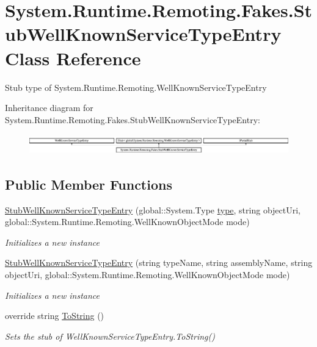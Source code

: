 \hypertarget{class_system_1_1_runtime_1_1_remoting_1_1_fakes_1_1_stub_well_known_service_type_entry}{\section{System.\-Runtime.\-Remoting.\-Fakes.\-Stub\-Well\-Known\-Service\-Type\-Entry Class Reference}
\label{class_system_1_1_runtime_1_1_remoting_1_1_fakes_1_1_stub_well_known_service_type_entry}
}


Stub type of System.\-Runtime.\-Remoting.\-Well\-Known\-Service\-Type\-Entry 


Inheritance diagram for System.\-Runtime.\-Remoting.\-Fakes.\-Stub\-Well\-Known\-Service\-Type\-Entry\-:\begin{figure}[H]
\begin{center}
\leavevmode
\includegraphics[height=0.886778cm]{class_system_1_1_runtime_1_1_remoting_1_1_fakes_1_1_stub_well_known_service_type_entry}
\end{center}
\end{figure}
\subsection*{Public Member Functions}
\begin{DoxyCompactItemize}
\item 
\hyperlink{class_system_1_1_runtime_1_1_remoting_1_1_fakes_1_1_stub_well_known_service_type_entry_a8bfaee9557196834b2a527d1a4659ef7}{Stub\-Well\-Known\-Service\-Type\-Entry} (global\-::\-System.\-Type \hyperlink{jquery-1_810_82-vsdoc_8js_a3940565e83a9bfd10d95ffd27536da91}{type}, string object\-Uri, global\-::\-System.\-Runtime.\-Remoting.\-Well\-Known\-Object\-Mode mode)
\begin{DoxyCompactList}\small\item\em Initializes a new instance\end{DoxyCompactList}\item 
\hyperlink{class_system_1_1_runtime_1_1_remoting_1_1_fakes_1_1_stub_well_known_service_type_entry_a31de50cb1a5d8957f6cc4330812f457a}{Stub\-Well\-Known\-Service\-Type\-Entry} (string type\-Name, string assembly\-Name, string object\-Uri, global\-::\-System.\-Runtime.\-Remoting.\-Well\-Known\-Object\-Mode mode)
\begin{DoxyCompactList}\small\item\em Initializes a new instance\end{DoxyCompactList}\item 
override string \hyperlink{class_system_1_1_runtime_1_1_remoting_1_1_fakes_1_1_stub_well_known_service_type_entry_a035934ef83247cae185917f6a5aa8ee8}{To\-String} ()
\begin{DoxyCompactList}\small\item\em Sets the stub of Well\-Known\-Service\-Type\-Entry.\-To\-String()\end{DoxyCompactList}\end{DoxyCompactItemize}
